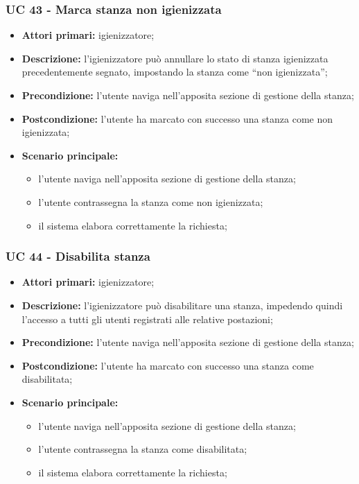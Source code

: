 \subsubsection{UC 43 - Marca stanza non igienizzata}

\begin{itemize}
\item \textbf{Attori primari:} igienizzatore;
\item \textbf{Descrizione:} l’igienizzatore può annullare lo stato di stanza igienizzata precedentemente segnato, impostando la stanza come “non igienizzata”;
\item \textbf{Precondizione:} l'utente naviga nell’apposita sezione di gestione della stanza; 
\item \textbf{Postcondizione:} l'utente ha marcato con successo una stanza come non igienizzata;
\item \textbf{Scenario principale:} 
	\begin{itemize}
		\item l’utente naviga nell’apposita sezione di gestione della stanza;	
		\item l'utente contrassegna la stanza come non igienizzata;
		\item il sistema elabora correttamente la richiesta;
	\end{itemize}
\end{itemize}

\subsubsection{UC 44 - Disabilita stanza}

\begin{itemize}
\item \textbf{Attori primari:} igienizzatore;
\item \textbf{Descrizione:} l’igienizzatore può disabilitare una stanza, impedendo quindi l’accesso a tutti gli utenti registrati alle relative postazioni;
\item \textbf{Precondizione:} l'utente naviga nell’apposita sezione di gestione della stanza; 
\item \textbf{Postcondizione:} l'utente ha marcato con successo una stanza come disabilitata;
\item \textbf{Scenario principale:} 
	\begin{itemize}
		\item l’utente naviga nell’apposita sezione di gestione della stanza;	
		\item l'utente contrassegna la stanza come disabilitata;
		\item il sistema elabora correttamente la richiesta;
	\end{itemize}
\end{itemize}



